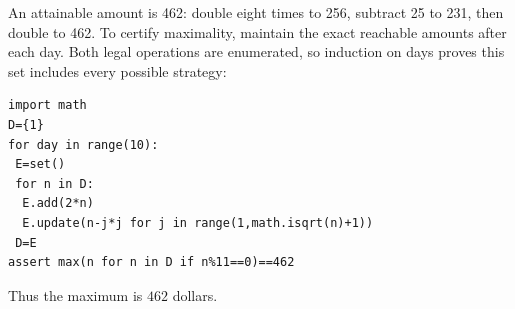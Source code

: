 An attainable amount is 462: double eight times to 256, subtract 25 to 231, then double to 462. To certify maximality, maintain the exact reachable amounts after each day. Both legal operations are enumerated, so induction on days proves this set includes every possible strategy:
\begin{verbatim}
import math
D={1}
for day in range(10):
 E=set()
 for n in D:
  E.add(2*n)
  E.update(n-j*j for j in range(1,math.isqrt(n)+1))
 D=E
assert max(n for n in D if n%11==0)==462
\end{verbatim}
Thus the maximum is $\boxed{462}$ dollars.
